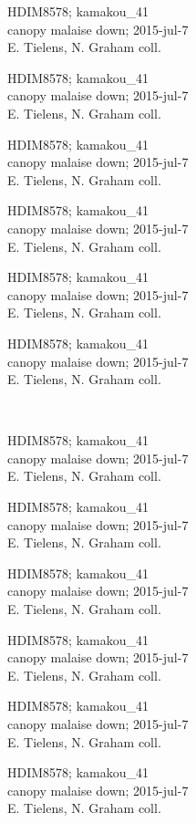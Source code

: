 \documentclass[2pt]{extarticle}
\begin{document}
\noindent
\parbox{0.16\textwidth}{\tiny \raggedright \rule[-0.3\baselineskip]{0pt}{10pt}HDIM8578; kamakou\_41\\ canopy malaise down; 2015-jul-7\\ E. Tielens, N. Graham coll.}
\parbox{0.16\textwidth}{\tiny \raggedright \rule[-0.3\baselineskip]{0pt}{10pt}HDIM8578; kamakou\_41\\ canopy malaise down; 2015-jul-7\\ E. Tielens, N. Graham coll.}
\parbox{0.16\textwidth}{\tiny \raggedright \rule[-0.3\baselineskip]{0pt}{10pt}HDIM8578; kamakou\_41\\ canopy malaise down; 2015-jul-7\\ E. Tielens, N. Graham coll.}
\parbox{0.16\textwidth}{\tiny \raggedright \rule[-0.3\baselineskip]{0pt}{10pt}HDIM8578; kamakou\_41\\ canopy malaise down; 2015-jul-7\\ E. Tielens, N. Graham coll.}
\parbox{0.16\textwidth}{\tiny \raggedright \rule[-0.3\baselineskip]{0pt}{10pt}HDIM8578; kamakou\_41\\ canopy malaise down; 2015-jul-7\\ E. Tielens, N. Graham coll.}
\parbox{0.16\textwidth}{\tiny \raggedright \rule[-0.3\baselineskip]{0pt}{10pt}HDIM8578; kamakou\_41\\ canopy malaise down; 2015-jul-7\\ E. Tielens, N. Graham coll.} \\ 
\vspace{0.001in} 

\noindent
\parbox{0.16\textwidth}{\tiny \raggedright \rule[-0.3\baselineskip]{0pt}{10pt}HDIM8578; kamakou\_41\\ canopy malaise down; 2015-jul-7\\ E. Tielens, N. Graham coll.}
\parbox{0.16\textwidth}{\tiny \raggedright \rule[-0.3\baselineskip]{0pt}{10pt}HDIM8578; kamakou\_41\\ canopy malaise down; 2015-jul-7\\ E. Tielens, N. Graham coll.}
\parbox{0.16\textwidth}{\tiny \raggedright \rule[-0.3\baselineskip]{0pt}{10pt}HDIM8578; kamakou\_41\\ canopy malaise down; 2015-jul-7\\ E. Tielens, N. Graham coll.}
\parbox{0.16\textwidth}{\tiny \raggedright \rule[-0.3\baselineskip]{0pt}{10pt}HDIM8578; kamakou\_41\\ canopy malaise down; 2015-jul-7\\ E. Tielens, N. Graham coll.}
\parbox{0.16\textwidth}{\tiny \raggedright \rule[-0.3\baselineskip]{0pt}{10pt}HDIM8578; kamakou\_41\\ canopy malaise down; 2015-jul-7\\ E. Tielens, N. Graham coll.}
\parbox{0.16\textwidth}{\tiny \raggedright \rule[-0.3\baselineskip]{0pt}{10pt}HDIM8578; kamakou\_41\\ canopy malaise down; 2015-jul-7\\ E. Tielens, N. Graham coll.} \\ 
\vspace{0.001in} 
\end{document}
